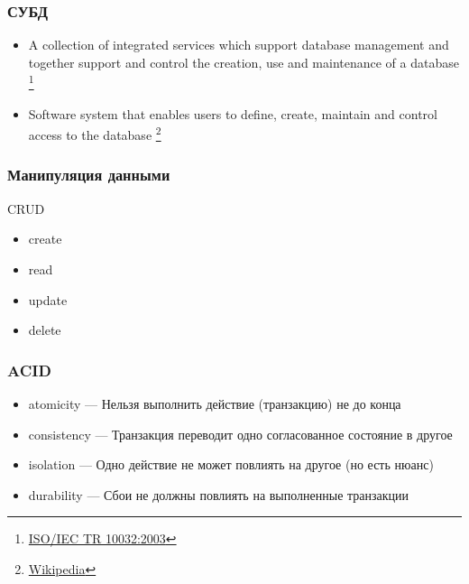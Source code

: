 \documentclass[aspectratio=169]{beamer}
\begin{document}
\begin{frame}[fragile]
  \transwipe[direction=90]
  \frametitle{СУБД}
  
  \begin{itemize}
    \item A collection of integrated services which support database management and together support and control the creation, use and maintenance of a database \footnote{\href{https://www.iso.org/obp/ui/\#iso:std:iso-iec:tr:10032:ed-1:v1:en}{ISO/IEC TR 10032:2003}}
    \item Software system that enables users to define, create, maintain and control access to the database \footnote{\href{https://en.wikipedia.org/wiki/Database\#Database_management_system}{Wikipedia}}
  \end{itemize}
\end{frame}

\begin{frame}[fragile]
  \transwipe[direction=90]
  \frametitle{Манипуляция данными}

  CRUD
  \begin{itemize}
    \item create
    \item read
    \item update
    \item delete
  \end{itemize}
\end{frame}

\begin{frame}[fragile]
  \transwipe[direction=90]
  \frametitle{ACID}

  \begin{itemize}
    \item atomicity --- Нельзя выполнить действие (транзакцию) не до конца
    \item consistency --- Транзакция переводит одно согласованное состояние в другое
    \item isolation --- Одно действие не может повлиять на другое (но есть нюанс)
    \item durability --- Сбои не должны повлиять на выполненные транзакции
  \end{itemize}
\end{frame}
\end{document}
